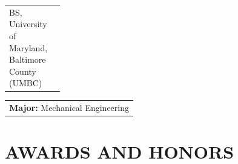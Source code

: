 \documentclass[a4paper,10pt]{article}
\begin{document}
\noindent\begin{tabularx}{\linewidth}{@{}>{\raggedright\arraybackslash}X>{\raggedleft\arraybackslash}p{0.18\linewidth}@{}}BS, University of Maryland, Baltimore County (UMBC) & 2003\\\end{tabularx}
\noindent\begin{tabularx}{\linewidth}{@{}>{\raggedright\arraybackslash}X@{}}\textbf{Major:} Mechanical Engineering\\\end{tabularx}




\section*{AWARDS AND HONORS}
\end{document}
